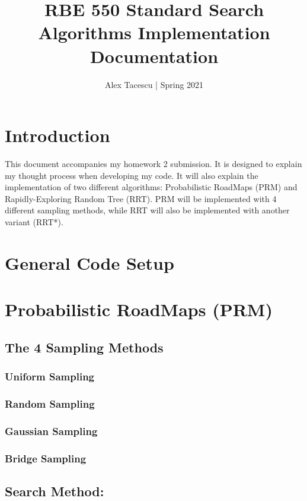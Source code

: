 \documentclass[journal]{IEEEtran}
\title{RBE 550 Standard Search Algorithms Implementation Documentation}
\author{Alex Tacescu | Spring 2021
}
\begin{document}
    \maketitle

    \section{Introduction}
    This document accompanies my homework 2 submission. It is designed to explain my thought process when developing my code. It will also explain the implementation of two different algorithms: Probabilistic RoadMaps (PRM) and Rapidly-Exploring Random Tree (RRT). PRM will be implemented with 4 different sampling methods, while RRT will also be implemented with another variant (RRT*).

    \section{General Code Setup}

    \section{Probabilistic RoadMaps (PRM)}

    \subsection{The 4 Sampling Methods}

    \subsubsection{Uniform Sampling}

    \subsubsection{Random Sampling}

    \subsubsection{Gaussian Sampling}

    \subsubsection{Bridge Sampling}

    \subsection{Search Method: }
\end{document}
